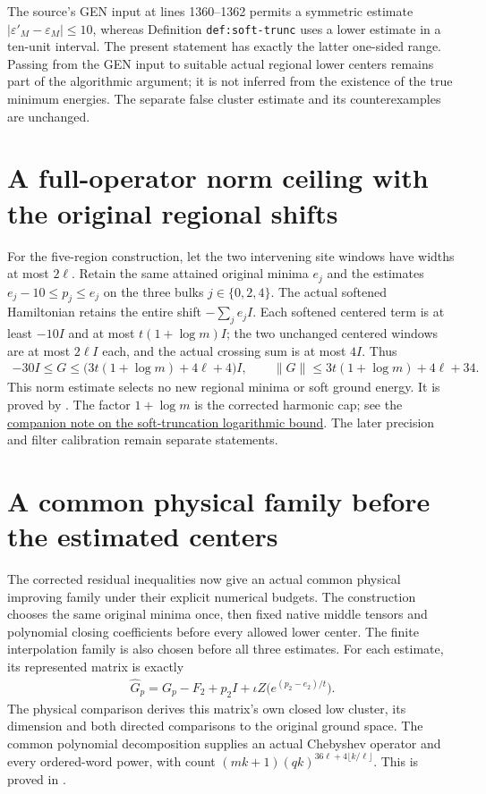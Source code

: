 \documentclass{article}
\begin{document}
The source's GEN input at lines 1360--1362 permits a symmetric estimate
$|\varepsilon'_M-\varepsilon_M|\leq10$, whereas Definition
\texttt{def:soft-trunc} uses a lower estimate in a ten-unit interval.
The present statement has exactly the latter one-sided range. Passing
from the GEN input to suitable actual regional lower centers remains
part of the algorithmic argument; it is not inferred from the existence
of the true minimum energies. The separate false cluster estimate and
its counterexamples are unchanged.

\section{A full-operator norm ceiling with the original regional shifts}

For the five-region construction, let the two intervening site windows
have widths at most $2\ell$. Retain the same attained original minima
$e_j$ and the estimates $e_j-10\le p_j\le e_j$ on the three bulks
$j\in\{0,2,4\}$. The actual softened Hamiltonian retains the entire
shift $-\sum_j e_jI$. Each softened centered term is at least $-10I$
and at most $t(1+\log m)I$; the two unchanged centered windows are at
most $2\ell I$ each, and the actual crossing sum is at most $4I$.
Thus
\begin{align}
 -30I\le G\le\bigl(3t(1+\log m)+4\ell+4\bigr)I,
 \qquad
 \|G\|\le3t(1+\log m)+4\ell+34.
\end{align}
This norm estimate selects no new regional minima or soft ground energy.
It is proved by
.
The factor $1+\log m$ is the corrected harmonic cap; see the
\href{https://sirui-lu.com/QICLean/paper-gaps/alvv16_soft_truncation_log_bound.pdf}
{companion note on the soft-truncation logarithmic bound}.
The later precision and filter calibration remain separate statements.

\section{A common physical family before the estimated centers}

The corrected residual inequalities now give an actual common physical
improving family under their explicit numerical budgets. The construction
chooses the same original minima once, then fixed native middle tensors
and polynomial closing coefficients before every allowed lower center.
The finite interpolation family is also chosen before all three estimates.
For each estimate, its represented matrix is exactly
\begin{align}
 \widehat G_p=G_p-F_2+p_2I+\iota Z\bigl(e^{(p_2-e_2)/t}\bigr).
\end{align}
The physical comparison derives this matrix's own closed low cluster,
its dimension and both directed comparisons to the original ground space.
The common polynomial decomposition supplies an actual Chebyshev operator
and every ordered-word power, with count
$(mk+1)(qk)^{36\ell+4\lfloor k/\ell\rfloor}$.
This is proved in
.
\end{document}
